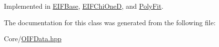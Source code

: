 Implemented in \hyperlink{classEIFBase_a85937003fd68b507ddc99bfcee3a4b27}{EIFBase}, \hyperlink{classEIFChiOneD_a014a763220034f5547c2d395b3508b8d}{EIFChiOneD}, and \hyperlink{classPolyFit_a2f8bf8460f31aef010e67950c3db0c82}{PolyFit}.



The documentation for this class was generated from the following file:\begin{DoxyCompactItemize}
\item 
Core/\hyperlink{OIFData_8hpp}{OIFData.hpp}\end{DoxyCompactItemize}
